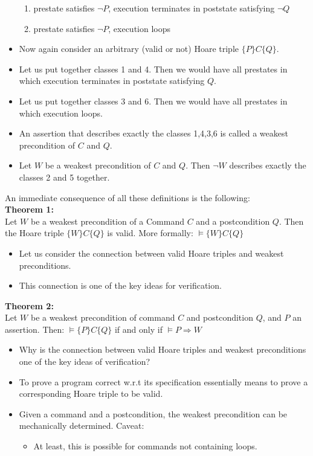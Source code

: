 \begin{multicols}{2}
\begin{itemize}
\begin{enumerate}
    \item prestate satisfies $\neg P$, execution terminates in poststate satisfying $\neg Q$
    \item prestate satisfies $\neg P$, execution loops
  \end{enumerate}
  \item Now again consider an arbitrary (valid or not) Hoare triple $\{P\}C\{Q\}$.
  \item Let us put together classes 1 and 4. Then we would have all prestates in which execution terminates in poststate satisfying $Q.$
  \item Let us put together classes 3 and 6. Then we would have all prestates in which execution loops.
  \item An assertion that describes exactly the classes 1,4,3,6 is called a weakest precondition of $C$ and $Q$.
  \item Let $W$ be a weakest precondition of $C$ and $Q$. Then $\neg W$ describes exactly the classes 2 and 5 together.
\end{itemize}
An immediate consequence of all these definitions is the following:\\
\textbf{Theorem 1:}\\
Let $W$ be a weakest precondition of a Command $C$ and a postcondition $Q$. Then the Hoare triple $\{W\}C\{Q\}$ is valid. More formally: $\models \{W\}C\{Q\}$
\begin{itemize}
  \item Let us consider the connection between valid Hoare triples and weakest preconditions.
  \item This connection is one of the key ideas for verification.
\end{itemize}
\textbf{Theorem 2:}\\
Let $W$ be a weakest precondition of command $C$ and postcondition $Q$, and $P$ an assertion. Then: $\models \{P\}C\{Q\}$ if and only if $\models P \Rightarrow W$
\begin{itemize}
  \item Why is the connection between valid Hoare triples and weakest preconditions one of the key ideas of verification?
  \item To prove a program correct w.r.t its specification essentially means to prove a corresponding Hoare triple to be valid.
  \item Given a command and a postcondition, the weakest precondition can be mechanically determined. Caveat:
  \begin{itemize}
    \item At least, this is possible for commands not containing loops.

\end{itemize}
\end{itemize}
\end{multicols}
